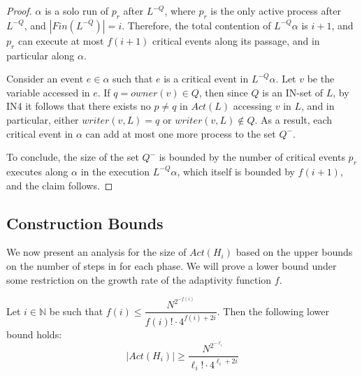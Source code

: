 \begin{proof}
	$\alpha$ is a solo run of $p_r$ after $L^{-Q}$, where $p_r$ is the only active process after $L^{-Q}$, and $|Fin(L^{-Q})| = i$. Therefore, the total contention of $L^{-Q} \alpha$ is $i+1$, and $p_r$ can execute at most $f(i+1)$ critical events along its passage, and in particular along $\alpha$.
	
	Consider an event $e \in \alpha$ such that $e$ is a critical event in $L^{-Q} \alpha$. Let $v$ be the variable accessed in $e$. If $q = owner(v) \in Q$, then since $Q$ is an IN-set of $L$, by IN4 it follows that there exists no $p \neq q$ in $Act(L)$ accessing $v$ in $L$, and in particular, either $writer(v,L) = q$ or $writer(v,L) \notin Q$. As a result, each critical event in $\alpha$ can add at most one more process to the set $Q^-$.
	
	To conclude, the size of the set $Q^-$ is bounded by the number of critical events $p_r$ executes along $\alpha$ in the execution $L^{-Q} \alpha$, which itself is bounded by $f(i+1)$, and the claim follows. 
\end{proof}









\newpage
\subsection{Construction Bounds}
We now present an analysis for the size of $Act(H_i)$ based on the upper bounds on the number of steps in for each phase. We will prove a lower bound under some restriction on the growth rate of the adaptivity function $f$.

\begin{theorem} \label{theorem: Act-lower-bound}
	Let $i \in \mathbb{N}$ be such that $f(i) \leq \dfrac{N^{2^{-f(i)}}} {f(i)! \cdot 4^{f(i)+2i}}$. Then the following lower bound holds:
	$$|Act(H_i)| \geq \frac{N^{2^{-\ell_i}}}{\ell_i! \cdot 4^{\ell_i+2i}}$$
\end{theorem}



